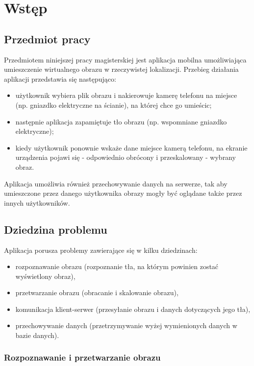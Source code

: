 \chapter{Wstęp}

\section{Przedmiot pracy}

Przedmiotem niniejszej pracy magisterskiej jest aplikacja mobilna umożliwiająca umieszczenie wirtualnego obrazu w rzeczywistej lokalizacji.
Przebieg działania aplikacji przedstawia się następująco:
\begin{itemize}
 \item użytkownik wybiera plik obrazu i nakierowuje kamerę telefonu na miejsce (np. gniazdko elektryczne na ścianie), na której chce go umieścic;
 \item następnie aplikacja zapamiętuje tło obrazu (np. wspomniane gniazdko elektryczne);
 \item kiedy użytkownik ponownie wskaże dane miejsce kamerą telefonu, na ekranie urządzenia pojawi się - odpowiednio obrócony i przeskalowany - wybrany obraz.
\end{itemize}

Aplikacja umożliwia również przechowywanie danych na serwerze, tak aby umieszczone przez danego użytkownika obrazy mogły być oglądane także przez innych użytkowników.



\section{Dziedzina problemu}
Aplikacja porusza problemy zawierające się w kilku dziedzinach:

\begin{itemize}
 \item rozpoznawanie obrazu (rozpoznanie tła, na którym powinien zostać wyświetlony obraz),
 \item przetwarzanie obrazu (obracanie i skalowanie obrazu),
 \item komunikacja klient-serwer (przesyłanie obrazu i danych dotyczących jego tła),
 \item przechowywanie danych (przetrzymywanie wyżej wymienionych danych w bazie danych).
\end{itemize}


\subsection{Rozpoznawanie i przetwarzanie obrazu}

